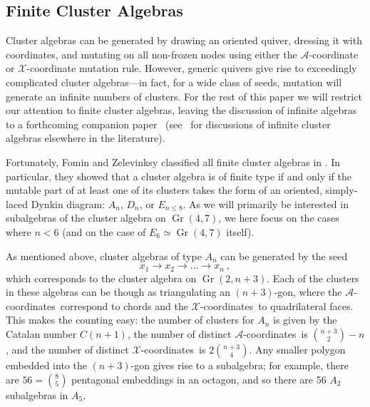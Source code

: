 \documentclass[11pt]{article}
\DeclareMathOperator{\Gr}{Gr}
\def\x{\mathcal{X}}
\def\xcoords{$\mathcal{X}$-coordinates}
\def\a{\mathcal{A}}
\def\acoords{$\mathcal{A}$-coordinates}
\begin{document}


\subsection{Finite Cluster Algebras}\label{sec:finite-algebras}

Cluster algebras can be generated by drawing an oriented quiver, dressing it with coordinates, and mutating on all non-frozen nodes using either the $\a$-coordinate or $\x$-coordinate mutation rule. However, generic quivers give rise to exceedingly complicated cluster algebras---in fact, for a wide class of seeds, mutation will generate an infinite numbers of clusters. For the rest of this paper we will restrict our attention to finite cluster algebras, leaving the discussion of infinite algebras to a forthcoming companion paper~\cite{} (see~\cite{} for discussions of infinite cluster algebras elsewhere in the literature). 


Fortunately, Fomin and Zelevinksy classified all finite cluster algebras in \cite{1054.17024}. In particular, they showed that a cluster algebra is of finite type if and only if the mutable part of at least one of its clusters takes the form of an oriented, simply-laced Dynkin diagram: $A_n$, $D_n$, or $E_{n\le8}$.  As we will primarily be interested in subalgebras of the cluster algebra on $\Gr(4,7)$, we here focus on the cases where $n < 6$ (and on the case of $E_6 \simeq \Gr(4,7)$ itself). 

As mentioned above, cluster algebras of type $A_n$ can be generated by the seed
\begin{equation}\label{def:An}
  x_1\to x_2\to \ldots \to x_n \ ,
\end{equation}
which corresponds to the cluster algebra on $\Gr(2,n{+}3)$. Each of the clusters in these algebras can be though as triangulating an $(n+3)$-gon, where the \acoords\ correspond to chords and the \xcoords\ to quadrilateral faces. This makes the counting easy: the number of clusters for $A_n$ is given by the Catalan number $C(n+1)$, the number of distinct \acoords\ is $\binom{n+3}{2}-n$, and the number of distinct \xcoords\ is $2\binom{n+3}{4}$. Any smaller polygon embedded into the $(n+3)$-gon gives rise to a subalgebra; for example, there are $56=\binom{8}{5}$ pentagonal embeddings in an octagon, and so there are 56 $A_2$ subalgebras in $A_5$. 
\end{document}
